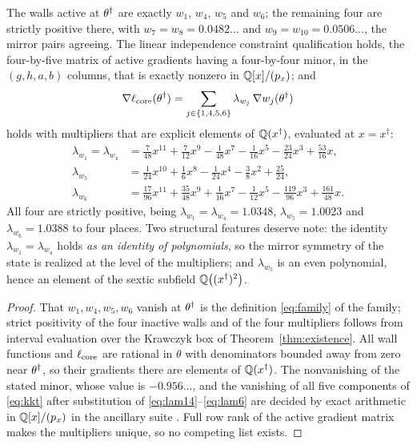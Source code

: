 \begin{theorem}\label{thm:kkt}
The walls active at $\theta^\dagger$ are exactly $w_1$, $w_4$, $w_5$ and $w_6$; the remaining four are strictly positive there, with $w_7=w_8=0.0482\ldots$ and $w_9=w_{10}=0.0506\ldots$, the mirror pairs agreeing. The linear independence constraint qualification holds, the four-by-five matrix of active gradients having a four-by-four minor, in the $(g,h,a,b)$ columns, that is exactly nonzero in $\mathbb{Q}[x]/(p_x)$; and
\begin{equation}\label{eq:kkt}
  \nabla\ell_{\mathrm{core}}(\theta^\dagger)=\sum_{j\in\{1,4,5,6\}}\lambda_{w_j}\,\nabla w_j(\theta^\dagger)
\end{equation}
holds with multipliers that are explicit elements of $\mathbb{Q}(x^\dagger)$, evaluated at $x=x^\dagger$:
\begin{align}
  \lambda_{w_1}=\lambda_{w_4}&=\tfrac7{48}x^{11}+\tfrac7{12}x^{9}-\tfrac1{48}x^{7}-\tfrac1{16}x^{5}-\tfrac{23}{24}x^{3}+\tfrac{53}{16}x,\label{eq:lam14}\\
  \lambda_{w_5}&=\tfrac1{24}x^{10}+\tfrac16x^{8}-\tfrac1{24}x^{4}-\tfrac38x^{2}+\tfrac{25}{24},\label{eq:lam5}\\
  \lambda_{w_6}&=\tfrac{17}{96}x^{11}+\tfrac{35}{48}x^{9}+\tfrac1{16}x^{7}-\tfrac1{12}x^{5}-\tfrac{119}{96}x^{3}+\tfrac{161}{48}x.\label{eq:lam6}
\end{align}
All four are strictly positive, being $\lambda_{w_1}=\lambda_{w_4}=1.0348$, $\lambda_{w_5}=1.0023$ and $\lambda_{w_6}=1.0388$ to four places. Two structural features deserve note: the identity $\lambda_{w_1}=\lambda_{w_4}$ holds \emph{as an identity of polynomials}, so the mirror symmetry of the state is realized at the level of the multipliers; and $\lambda_{w_5}$ is an even polynomial, hence an element of the sextic subfield $\mathbb{Q}\bigl((x^\dagger)^2\bigr)$.
\end{theorem}

\begin{proof}
That $w_1,w_4,w_5,w_6$ vanish at $\theta^\dagger$ is the definition \eqref{eq:family} of the family; strict positivity of the four inactive walls and of the four multipliers follows from interval evaluation over the Krawczyk box of Theorem~\ref{thm:existence}. All wall functions and $\ell_{\mathrm{core}}$ are rational in $\theta$ with denominators bounded away from zero near $\theta^\dagger$, so their gradients there are elements of $\mathbb{Q}(x^\dagger)$. The nonvanishing of the stated minor, whose value is $-0.956\ldots$, and the vanishing of all five components of \eqref{eq:kkt} after substitution of \eqref{eq:lam14}--\eqref{eq:lam6} are decided by exact arithmetic in $\mathbb{Q}[x]/(p_x)$ in the ancillary suite \cite{anc}. Full row rank of the active gradient matrix makes the multipliers unique, so no competing list exists.
\end{proof}


